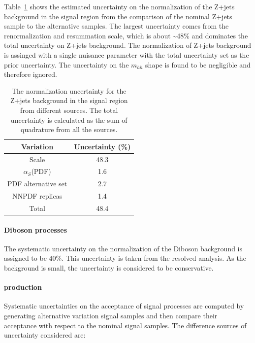 Table~\ref{tab:boosted_unc_zjets} shows the estimated uncertainty on the normalization of the Z+jets background in the signal region
from the comparison of the nominal Z+jets sample to the alternative samples. The largest uncertainty comes from the renormalization
and resummation scale, which is about \textasciitilde48\% and dominates the total uncertainty on Z+jets background. The normalization of Z+jets
background is assinged with a single nuisance parameter with the total uncertainty set as the prior uncertainty. The uncertainty on the
$m_{hh}$ shape is found to be negligible and therefore ignored. %
 
\begin{table}[htbp!]
\begin{center}
\begin{tabular}{c|c}
Variation  &  Uncertainty (\%) \\
\hline
Scale               &   48.3  \\
$\alpha_{S}$(PDF)   &   1.6   \\
PDF alternative set &   2.7   \\
NNPDF replicas      &   1.4   \\
\hline
Total               &   48.4  \\
\end{tabular}
\end{center}
\caption{The normalization uncertainty for the Z+jets background in the signal region
from different sources. The total uncertainty is calculated as the sum of quadrature from all
the sources.}
\label{tab:boosted_unc_zjets}
\end{table}
 
\FloatBarrier
\paragraph{Diboson processes}
\label{sec:boosted_syst_modeling_diboson}
The systematic uncertainty on the normalization of the Diboson background is assigned to be 40\%. This uncertainty
is taken from the resolved analysis. As the background is small, the uncertainty is considered to be conservative.
 
\paragraph{production}
\label{sec:boosted_syst_modeling_signal}
Systematic uncertainties on the acceptance of signal processes are computed by generating alternative variation signal samples
and then compare their acceptance with respect to the nominal signal samples. The difference sources of uncertainty considered are:
 
